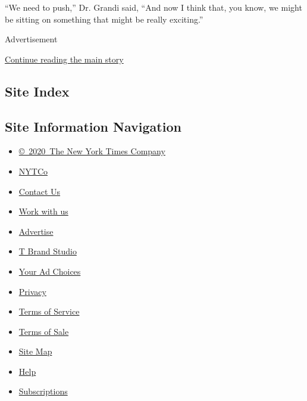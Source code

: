 ``We need to push,'' Dr. Grandi said, ``And now I think that, you know,
we might be sitting on something that might be really exciting.''

Advertisement

\protect\hyperlink{after-bottom}{Continue reading the main story}

\hypertarget{site-index}{%
\subsection{Site Index}\label{site-index}}

\hypertarget{site-information-navigation}{%
\subsection{Site Information
Navigation}\label{site-information-navigation}}

\begin{itemize}
\tightlist
\item
  \href{https://help.nytimes3xbfgragh.onion/hc/en-us/articles/115014792127-Copyright-notice}{©~2020~The
  New York Times Company}
\end{itemize}

\begin{itemize}
\tightlist
\item
  \href{https://www.nytco.com/}{NYTCo}
\item
  \href{https://help.nytimes3xbfgragh.onion/hc/en-us/articles/115015385887-Contact-Us}{Contact
  Us}
\item
  \href{https://www.nytco.com/careers/}{Work with us}
\item
  \href{https://nytmediakit.com/}{Advertise}
\item
  \href{http://www.tbrandstudio.com/}{T Brand Studio}
\item
  \href{https://www.nytimes3xbfgragh.onion/privacy/cookie-policy\#how-do-i-manage-trackers}{Your
  Ad Choices}
\item
  \href{https://www.nytimes3xbfgragh.onion/privacy}{Privacy}
\item
  \href{https://help.nytimes3xbfgragh.onion/hc/en-us/articles/115014893428-Terms-of-service}{Terms
  of Service}
\item
  \href{https://help.nytimes3xbfgragh.onion/hc/en-us/articles/115014893968-Terms-of-sale}{Terms
  of Sale}
\item
  \href{https://spiderbites.nytimes3xbfgragh.onion}{Site Map}
\item
  \href{https://help.nytimes3xbfgragh.onion/hc/en-us}{Help}
\item
  \href{https://www.nytimes3xbfgragh.onion/subscription?campaignId=37WXW}{Subscriptions}
\end{itemize}
